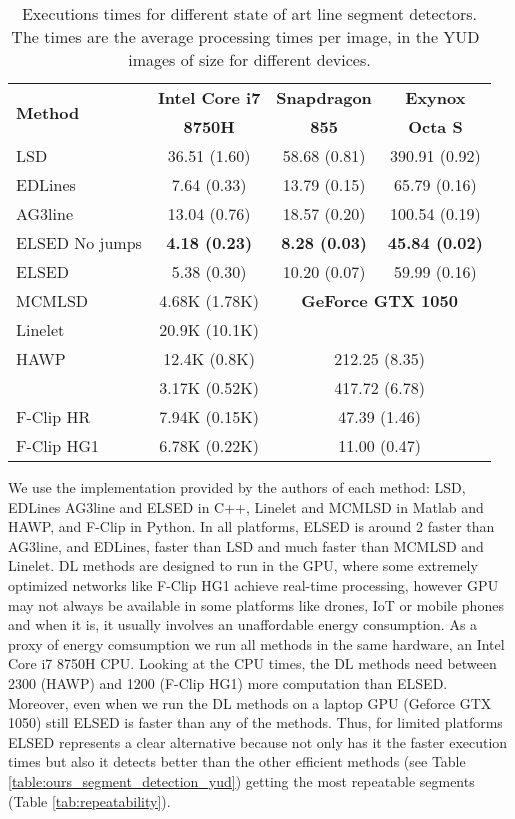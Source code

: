 \documentclass[preprint,12pt]{elsarticle}
\begin{document}
\begin{table}
\centering
\begin{tabular}{|l|c|c|c|}
\hline
\multirow{2}{*}{\textbf{Method}} & \textbf{Intel Core i7} & \textbf{Snapdragon} & \textbf{Exynox} \\
 & \textbf{8750H} & \textbf{855}& \textbf{Octa S} \\ 
\hline
LSD         & 36.51	(1.60)   & 58.68  (0.81) &  390.91 (0.92) \\
EDLines     & 7.64 (0.33)    & 13.79  (0.15) &  65.79 (0.16)  \\ 
AG3line     & 13.04 (0.76)   & 18.57  (0.20) &  100.54 (0.19) \\ 
ELSED No jumps & \textbf{4.18 (0.23)} & \textbf{8.28 (0.03)}  &  \textbf{45.84 (0.02)} \\ 
ELSED       & 5.38 (0.30)    & 10.20  (0.07) &  59.99 (0.16)  \\ \hline MCMLSD     & 4.68K (1.78K) & \multicolumn{2}{c|}{\textbf{GeForce GTX 1050}} \\ 
Linelet     & 20.9K (10.1K) & \multicolumn{2}{c|}{} \\ \cline{3-4}
HAWP        & 12.4K (0.8K) & \multicolumn{2}{c|}{212.25 (8.35) } \\
 & 3.17K (0.52K) & \multicolumn{2}{c|}{417.72 (6.78) } \\
F-Clip HR &  7.94K (0.15K) & \multicolumn{2}{c|}{47.39 (1.46) } \\
F-Clip HG1 & 6.78K (0.22K) & \multicolumn{2}{c|}{11.00 (0.47) } \\ \hline 
\hline
\end{tabular}
\caption{Executions times for different state of art line segment detectors. The times are the average processing times per image, in the YUD~\cite{denis2008efficient} images of size  for different devices. }
\label{table:segment_detection_times}
\end{table}
We use the implementation provided by the authors of each method: LSD, EDLines AG3line and ELSED in C++, Linelet and MCMLSD in Matlab and HAWP,  and F-Clip in Python. 
In all platforms, ELSED is around 2 faster than AG3line,  and EDLines,  faster than LSD and much faster than MCMLSD and Linelet. DL methods are designed to run in the GPU, where some extremely optimized networks like F-Clip HG1 achieve real-time processing, however GPU may not always be available in some platforms like drones, IoT or mobile phones and when it is, it usually involves an unaffordable energy consumption. As a proxy of energy comsumption we run all methods in the same hardware, an Intel Core i7 8750H CPU. 
Looking at the CPU times, the DL methods need between 2300 (HAWP) and 1200 (F-Clip HG1) more computation  than ELSED. Moreover, even when we run the DL methods on a laptop GPU (Geforce GTX 1050) still ELSED is faster than any of the methods. Thus, for limited platforms ELSED represents a clear alternative because not only has it the faster execution times but also it detects better than the other efficient methods (see Table \ref{table:ours_segment_detection_yud}) getting the most repeatable segments (Table \ref{tab:repeatability}).
\end{document}
